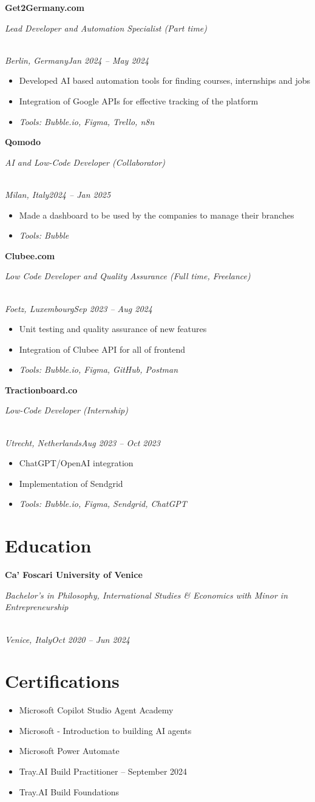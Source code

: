 \documentclass[a4paper,10pt]{article}
\newcommand{\role}[4]{\vspace{3pt}\noindent\hspace{0.6em}\parbox[t]{0.38\textwidth}{\raggedright\textbf{#1}}\hfill\parbox[t]{0.58\textwidth}{\raggedleft\textit{#2}}\\{\textit{#3}\hfill\textit{#4}}\vspace{1pt}}
\begin{document}
\role{Get2Germany.com}{Lead Developer and Automation Specialist (Part time)}{Berlin, Germany}{Jan 2024 -- May 2024}
\begin{itemize}
\item Developed AI based automation tools for finding courses, internships and jobs
\item Integration of Google APIs for effective tracking of the platform
\item \textit{Tools: Bubble.io, Figma, Trello, n8n}
\end{itemize}

\role{Qomodo}{AI and Low-Code Developer (Collaborator)}{Milan, Italy}{2024 -- Jan 2025}
\begin{itemize}
\item Made a dashboard to be used by the companies to manage their branches
\item \textit{Tools: Bubble}
\end{itemize}

\role{Clubee.com}{Low Code Developer and Quality Assurance (Full time, Freelance)}{Foetz, Luxembourg}{Sep 2023 -- Aug 2024}
\begin{itemize}
\item Unit testing and quality assurance of new features
\item Integration of Clubee API for all of frontend
\item \textit{Tools: Bubble.io, Figma, GitHub, Postman}
\end{itemize}

\role{Tractionboard.co}{Low-Code Developer (Internship)}{Utrecht, Netherlands}{Aug 2023 -- Oct 2023}
\begin{itemize}
\item ChatGPT/OpenAI integration
\item Implementation of Sendgrid
\item \textit{Tools: Bubble.io, Figma, Sendgrid, ChatGPT}
\end{itemize}

\section{Education}
\role{Ca' Foscari University of Venice}{Bachelor's in Philosophy, International Studies \& Economics with Minor in Entrepreneurship}{Venice, Italy}{Oct 2020 -- Jun 2024}

\section{Certifications}
\begin{itemize}
\item Microsoft Copilot Studio Agent Academy
\item Microsoft - Introduction to building AI agents
\item Microsoft Power Automate
\item Tray.AI Build Practitioner -- September 2024
\item Tray.AI Build Foundations
\end{itemize}
\end{document}
